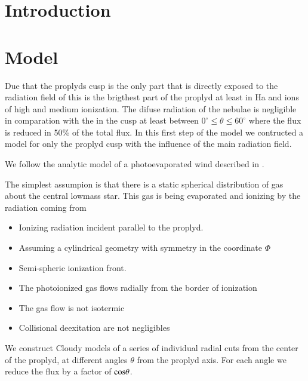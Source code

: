 \documentclass[aaspp]{article}
\begin{document}


\section{Introduction}
\label{sec:introduction}


\section{Model}
\label{sec:model}

Due that the proplyds cusp is the only part that is directly exposed
to the radiation field of \tc this is the brigthest part of
the proplyd at least in Ha and ions of high and medium ionization. The
difuse radiation of the nebulae is negligible in comparation with
the \tc in the cusp at least between $0^{\circ}\le \theta \le
60^{\circ}$ where the flux is reduced in 50\% of the total flux. In this first step of the model we contructed a model for only
the proplyd cusp with the influence of the main radiation field.

We follow the analytic model of a photoevaporated wind described in \citet{1998AJ....116..322H}.
 
The simplest assumpion is that there is a static spherical distribution of gas about the central lowmass star. This gas is being evaporated and ionizing by the radiation coming from \tc

\begin{itemize}
\item{Ionizing radiation incident parallel to the proplyd.}
\item{Assuming a cylindrical geometry with symmetry in the coordinate $\Phi$}
\item{Semi-spheric ionization front.}
\item{The photoionized gas flows radially from the border of
    ionization}
\item{The gas flow is not isotermic}
\item{Collisional deexitation are not negligibles}
\end{itemize}

We construct Cloudy models of a series of individual radial cuts from
the center of the proplyd, at different angles $\theta$ from the
proplyd axis. For each angle we reduce the flux by a factor of $\rm
cos \theta$.
\end{document}
